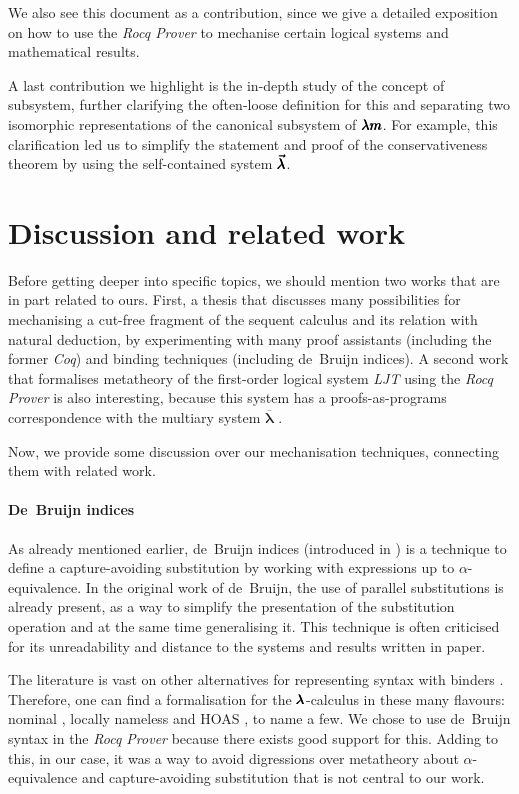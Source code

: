 We also see this document as a contribution, since we give a detailed exposition on how to use the \textit{Rocq Prover} to mechanise certain logical systems and mathematical results.

A last contribution we highlight is the in-depth study of the concept of subsystem, further clarifying the often-loose definition for this and separating two isomorphic representations of the canonical subsystem of $\pmb{\lambda m}$.
For example, this clarification led us to simplify the statement and proof of the conservativeness theorem by using the self-contained system $\pmb{\vec \lambda}$.

\section{Discussion and related work}

Before getting deeper into specific topics, we should mention two works that are in part related to ours.
First, a thesis \cite{AndrewAdams} that discusses many possibilities for mechanising a cut-free fragment of the sequent calculus and its relation with natural deduction, by experimenting with many proof assistants (including the former \textit{Coq}) and binding techniques (including de~Bruijn indices).
A second work \cite{Herbelin2017} that formalises metatheory of the first-order logical system \textit{LJT} using the \textit{Rocq Prover} is also interesting, because this system has a proofs-as-programs correspondence with the multiary system $\overline{\pmb \lambda}$ \cite{Herbelin1994}. 

Now, we provide some discussion over our mechanisation techniques, connecting them with related work.

\paragraph{De~Bruijn indices}
As already mentioned earlier, de~Bruijn indices (introduced in \cite{deBruijn}) is a technique to define a capture-avoiding substitution by working with expressions up to $\alpha$-equivalence.
In the original work of de~Bruijn, the use of parallel substitutions is already present, as a way to simplify the presentation of the substitution operation and at the same time generalising it.
This technique is often criticised for its unreadability and distance to the systems and results written in paper.

The literature is vast on other alternatives for representing syntax with binders \cite[Section~2.3]{POPLmark}.
Therefore, one can find a formalisation for the $\pmb{\lambda}$-calculus in these many flavours: nominal \cite{Vestergaard2001}, locally nameless \cite{McKinna1999} and HOAS \cite{Despeyroux1995}, to name a few.
We chose to use de~Bruijn syntax in the \textit{Rocq Prover} because there exists good support for this.
Adding to this, in our case, it was a way to avoid digressions over metatheory about $\alpha$-equivalence and capture-avoiding substitution that is not central to our work.

